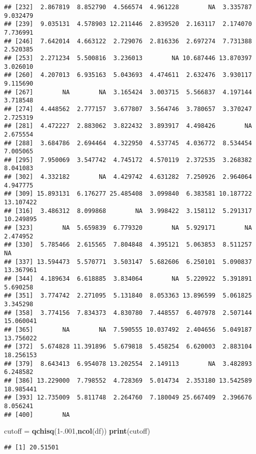 \documentclass[
]{article}
\newenvironment{Shaded}{\begin{snugshade}}{\end{snugshade}}
\newcommand{\DecValTok}[1]{\textcolor[rgb]{0.00,0.00,0.81}{#1}}
\newcommand{\FloatTok}[1]{\textcolor[rgb]{0.00,0.00,0.81}{#1}}
\newcommand{\KeywordTok}[1]{\textcolor[rgb]{0.13,0.29,0.53}{\textbf{#1}}}
\newcommand{\NormalTok}[1]{#1}
\newcommand{\StringTok}[1]{\textcolor[rgb]{0.31,0.60,0.02}{#1}}
\begin{document}
\begin{verbatim}
## [232]  2.867819  8.852790  4.566574  4.961228        NA  3.335787  9.032479
## [239]  9.035131  4.578903 12.211446  2.839520  2.163117  2.174070  7.736991
## [246]  7.642014  4.663122  2.729076  2.816336  2.697274  7.731388  2.520385
## [253]  2.271234  5.500816  3.236013        NA 10.687446 13.870397  3.026010
## [260]  4.207013  6.935163  5.043693  4.474611  2.632476  3.930117  9.115690
## [267]        NA        NA  3.165424  3.003715  5.566837  4.197144  3.718548
## [274]  4.448562  2.777157  3.677807  3.564746  3.780657  3.370247  2.725319
## [281]  4.472227  2.883062  3.822432  3.893917  4.498426        NA  2.675554
## [288]  3.684786  2.694464  4.322950  4.537745  4.036772  8.534454  7.005065
## [295]  7.950069  3.547742  4.745172  4.570119  2.372535  3.268382  8.041083
## [302]  4.332182        NA  4.429742  4.631282  7.250926  2.964064  4.947775
## [309] 15.893131  6.176277 25.485408  3.099840  6.383581 10.187722 13.107422
## [316]  3.486312  8.099868        NA  3.998422  3.158112  5.291317 10.249895
## [323]        NA  5.659839  6.779320        NA  5.929171        NA  2.474952
## [330]  5.785466  2.615565  7.804848  4.395121  5.063853  8.511257        NA
## [337] 13.594473  5.570771  3.503147  5.682606  6.250101  5.090837 13.367961
## [344]  4.189634  6.618885  3.834064        NA  5.220922  5.391891  5.690258
## [351]  3.774742  2.271095  5.131840  8.053363 13.896599  5.061825  3.345298
## [358]  3.774156  7.834373  4.830780  7.448557  6.407978  2.507144 15.060041
## [365]        NA        NA  7.590555 10.037492  2.404656  5.049187 13.756022
## [372]  5.674828 11.391896  5.679818  5.458254  6.620003  2.883104 18.256153
## [379]  8.643413  6.954078 13.202554  2.149113        NA  3.482893  6.248582
## [386] 13.229000  7.798552  4.728369  5.014734  2.353180 13.542589 18.985441
## [393] 12.735009  5.811748  2.264760  7.180049 25.667409  2.396676  8.056241
## [400]        NA
\end{verbatim}

\begin{Shaded}
\begin{Highlighting}[]
\NormalTok{cutoff =}\StringTok{ }\KeywordTok{qchisq}\NormalTok{(}\DecValTok{1}\FloatTok{-.001}\NormalTok{,}\KeywordTok{ncol}\NormalTok{(df))}
\KeywordTok{print}\NormalTok{(cutoff)}
\end{Highlighting}
\end{Shaded}

\begin{verbatim}
## [1] 20.51501
\end{verbatim}
\end{document}
